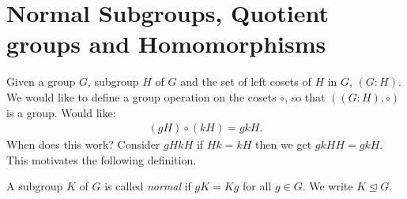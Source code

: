 
\hypertarget{normal-subgroups-quotient-groups-and-homomorphisms}{%
\section{Normal Subgroups, Quotient groups and Homomorphisms}\label{normal-subgroups-quotient-groups-and-homomorphisms}}

Given a group \(G\), subgroup \(H\) of \(G\) and the set of left cosets of \(H\) in \(G\), \((G : H)\).
We would like to define a group operation on the cosets \(\circ\), so that \(((G : H), \circ)\) is a group.
Would like:
\begin{align*}
    (gH) \circ (k H) = gkH.
\end{align*}
When does this work?
Consider \(gH kH\) if \(Hk = kH\) then we get \(gkHH = gkH\).\\
This motivates the following definition.

\begin{definition}
A subgroup \(K\) of \(G\) is called \emph{normal} if \(gK = Kg\) for all \(g \in G\).
We write \(K \trianglelefteq G\).
\end{definition}

